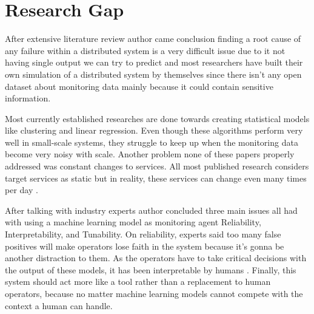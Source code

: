 \section{Research Gap}

After extensive literature review author came conclusion finding a root cause of any failure within a distributed system is a very difficult issue due to it not having single output we can try to predict and most researchers have built their own simulation of a distributed system by themselves since there isn't any open dataset about monitoring data mainly because it could contain sensitive information. 

Most currently established researches are done towards creating statistical models like clustering and linear regression. Even though these algorithms perform very well in small-scale systems, they struggle to keep up when the monitoring data become very noisy with scale. Another problem none of these papers properly  addressed was constant changes to services. All most published research considers target services as static but in reality, these services can change even many times per day \citep{GoingtoM51:online}.

After talking with industry experts author concluded three main issues all had with using a machine learning model as monitoring agent Reliability, Interpretability, and Tunability. On reliability, experts said too many false positives will make operators lose faith in the system because it's gonna be another distraction to them. As the operators have to take critical decisions with the output of these models, it has been interpretable by humans \citep{ribeiro2016should}. Finally, this system should act more like a tool rather than a replacement to human operators, because no matter machine learning models cannot compete with the context a human can handle. 
